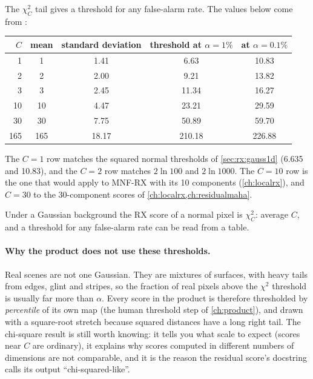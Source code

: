 The $\chi^2_C$ tail gives a threshold for any false-alarm rate. The values below come from
\tagC:
\begin{center}
\begin{tabular}{rcccc}
\toprule
$C$ & mean & standard deviation & threshold at $\alpha = 1\%$ & at $\alpha = 0.1\%$\\
\midrule
1   & 1   & 1.41  & 6.63   & 10.83\\
2   & 2   & 2.00  & 9.21   & 13.82\\
3   & 3   & 2.45  & 11.34  & 16.27\\
10  & 10  & 4.47  & 23.21  & 29.59\\
30  & 30  & 7.75  & 50.89  & 59.70\\
165 & 165 & 18.17 & 210.18 & 226.88\\
\bottomrule
\end{tabular}
\end{center}
The $C = 1$ row matches the squared normal thresholds of \cref{sec:rx:gauss1d} (6.635 and 10.83), and
the $C = 2$ row matches $2\ln100$ and $2\ln1000$. The $C = 10$ row is the one that would apply to
MNF-RX with its 10 components (\cref{ch:localrx}), and $C = 30$ to the 30-component scores of
\cref{ch:localrx,ch:residualmaha}.

\begin{keypoint}
Under a Gaussian background the RX score of a normal pixel is $\chi^2_C$: average $C$, and a
threshold for any false-alarm rate can be read from a table.
\end{keypoint}

\paragraph{Why the product does not use these thresholds.} Real scenes are not one Gaussian. They
are mixtures of surfaces, with heavy tails from edges, glint and stripes, so the fraction of real
pixels above the $\chi^2$ threshold is usually far more than $\alpha$. Every score in the product is
therefore thresholded by \emph{percentile} of its own map (the human threshold step of
\cref{ch:product}), and drawn with a square-root stretch because squared distances have a long right
tail. The chi-square result is still worth knowing: it tells you what scale to expect (scores near
$C$ are ordinary), it explains why scores computed in different numbers of dimensions are not
comparable, and it is the reason the residual score's docstring calls its output
``chi-squared-like''.

